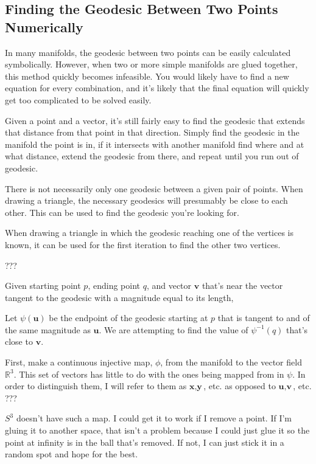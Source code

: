 \subsection{Finding the Geodesic Between Two Points Numerically}

In many manifolds, the geodesic between two points can be easily calculated symbolically. However, when two or more simple manifolds are glued together, this method quickly becomes infeasible. You would likely have to find a new equation for every combination, and it's likely that the final equation will quickly get too complicated to be solved easily.

Given a point and a vector, it's still fairly easy to find the geodesic that extends that distance from that point in that direction. Simply find the geodesic in the manifold the point is in, if it intersects with another manifold find where and at what distance, extend the geodesic from there, and repeat until you run out of geodesic.

There is not necessarily only one geodesic between a given pair of points. When drawing a triangle, the necessary geodesics will presumably be close to each other. This can be used to find the geodesic you're looking for.

When drawing a triangle in which the geodesic reaching one of the vertices is known, it can be used for the first iteration to find the other two vertices.

???

Given starting point $p$, ending point $q$, and vector $\textbf{v}$ that's near the vector tangent to the geodesic with a magnitude equal to its length,

Let $\psi(\textbf{u})$ be the endpoint of the geodesic starting at $p$ that is tangent to and of the same magnitude as $\textbf{u}$. We are attempting to find the value of $\psi^{-1}(q)$ that's close to $\textbf{v}$.

First, make a continuous injective map, $\phi$, from the manifold to the vector field $\mathbb{R}^3$. This set of vectors has little to do with the ones being mapped from in $\psi$. In order to distinguish them, I will refer to them as $\textbf{x}, \textbf{y}$, etc. as opposed to $\textbf{u}, \textbf{v}$, etc. ???

$S^3$ doesn't have such a map. I could get it to work if I remove a point. If I'm gluing it to another space, that isn't a problem because I could just glue it so the point at infinity is in the ball that's removed. If not, I can just stick it in a random spot and hope for the best.

